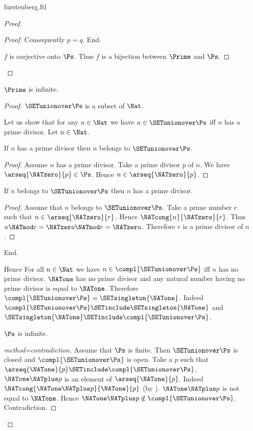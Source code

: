 \documentclass{article}
\begin{document}
\begin{smodule}{furstenberg.ftl}
\begin{forthel}
\begin{proof}
\begin{proof}
        Consequently $p = q$.
      End.

      $f$ is surjective onto $\Ps$.
      Thus $f$ is a bijection between $\Prime$ and $\Ps$.
    \end{proof}
  \end{proof}

  \begin{theorem}[title=Furstenberg]
    $\Prime$ is infinite.
  \end{theorem}
  \begin{proof}
    $\SETunionover \Ps$ is a subset of $\Nat$.

    Let us show that for any $n \in \Nat$ we have $n \in \SETunionover \Ps$ iff $n$
    has a prime divisor.
      Let $n \in \Nat$.

      If $n$ has a prime divisor then $n$ belongs to $\SETunionover \Ps$.
      \begin{proof}
        Assume $n$ has a prime divisor.
        Take a prime divisor $p$ of $n$.
        We have $\arseq{\NATzero}{p} \in \Ps$.
        Hence $n \in \arseq{\NATzero}{p}$.
      \end{proof}

      If $n$ belongs to $\SETunionover \Ps$ then $n$ has a prime divisor.
      \begin{proof}
        Assume that $n$ belongs to $\SETunionover \Ps$.
        Take a prime number $r$ such that $n \in \arseq{\NATzero}{r}$.
        Hence $\NATcong{n}{\NATzero}{r}$.
        Thus $n \NATmod r = \NATzero \NATmod r = \NATzero$.
        Therefore $r$ is a prime divisor of $n$.
      \end{proof}
    End.

    Hence For all $n \in \Nat$ we have $n \in \compl{\SETunionover \Ps}$ iff
    $n$ has no prime divisor.
    $\NATone$ has no prime divisor and any natural number having no prime
    divisor is equal to $\NATone$.
    Therefore $\compl{\SETunionover \Ps} = \SETsingleton{\NATone}$.
    Indeed $\compl{\SETunionover \Ps} \SETinclude \SETsingleton{\NATone}$ and $\SETsingleton{\NATone}
    \SETinclude \compl{\SETunionover \Ps}$. %

    $\Ps$ is infinite.
    \begin{proof}[method=contradiction]
      Assume that $\Ps$ is finite.
      Then $\SETunionover \Ps$ is closed and $\compl{\SETunionover \Ps}$ is open.
      Take a $p$ such that $\arseq{\NATone}{p} \SETinclude \compl{\SETunionover \Ps}$.
      $\NATone \NATplus p$ is an element of $\arseq{\NATone}{p}$.
      Indeed $\NATcong{\NATone \NATplus p}{\NATone}{p}$
      (by ).
      $\NATone \NATplus p$ is not equal to $\NATone$.
      Hence $\NATone \NATplus p \notin \compl{\SETunionover \Ps}$.
      Contradiction.
    \end{proof}
  \end{proof}
\end{forthel}

\printbibliography
{}
\end{smodule}
\end{document}
